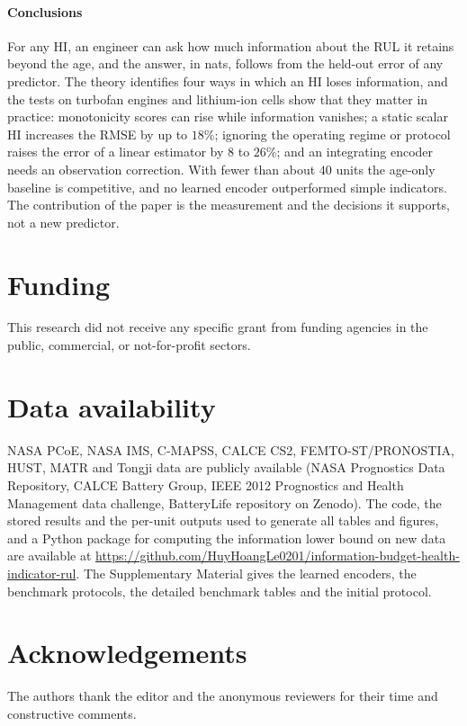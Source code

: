 \documentclass[preprint,12pt]{elsarticle}
\theoremstyle{definition}
\begin{document}
\paragraph{Conclusions} For any HI, an engineer can ask how much information about the RUL it retains beyond the age, and the answer, in nats, follows from the held-out error of any predictor. The theory identifies four ways in which an HI loses information, and the tests on turbofan engines and lithium-ion cells show that they matter in practice: monotonicity scores can rise while information vanishes; a static scalar HI increases the RMSE by up to $18\%$; ignoring the operating regime or protocol raises the error of a linear estimator by $8$ to $26\%$; and an integrating encoder needs an observation correction. With fewer than about $40$ units the age-only baseline is competitive, and no learned encoder outperformed simple indicators. The contribution of the paper is the measurement and the decisions it supports, not a new predictor.

\section*{Funding}
This research did not receive any specific grant from funding agencies in the public, commercial, or not-for-profit sectors.
\section*{Data availability}
NASA PCoE, NASA IMS, C-MAPSS, CALCE CS2, FEMTO-ST/PRONOSTIA, HUST, MATR and Tongji data are publicly available (NASA Prognostics Data Repository, CALCE Battery Group, IEEE 2012 Prognostics and Health Management data challenge, BatteryLife repository on Zenodo). The code, the stored results and the per-unit outputs used to generate all tables and figures, and a Python package for computing the information lower bound on new data are available at \url{https://github.com/HuyHoangLe0201/information-budget-health-indicator-rul}. The Supplementary Material gives the learned encoders, the benchmark protocols, the detailed benchmark tables and the initial protocol.
\section*{Acknowledgements}
The authors thank the editor and the anonymous reviewers for their time and constructive comments.




\end{document}
